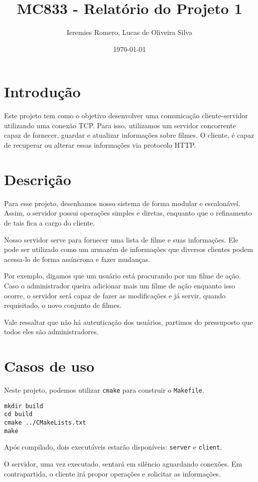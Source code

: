 \documentclass[11pt]{article}
\author{Ieremies Romero, Lucas de Oliveira Silva}
\date{\today}
\title{MC833 - Relatório do Projeto 1}
\theoremstyle{definition}
\theoremstyle{definition}
\theoremstyle{remark}
\theoremstyle{remark}
\theoremstyle{remark}
\theoremstyle{remark}
\theoremstyle{definition}
\begin{document}
\maketitle

\section*{Introdução}
\label{sec:org903b202}
Este projeto tem como o objetivo desenvolver uma comunicação cliente-servidor utilizando uma conexão TCP. Para isso, utilizamos um servidor concorrente capaz de fornecer, guardar e atualizar informações sobre filmes. O cliente, é capaz de recuperar ou alterar essas informações via protocolo HTTP.

\section*{Descrição}
\label{sec:orgba01a2d}
Para esse projeto, desenhamos nosso sistema de forma modular e escalonável. Assim, o servidor possui operações simples e diretas, enquanto que o refinamento de tais fica a cargo do cliente.

Nosso servidor serve para fornecer uma lista de filme e suas informações. Ele pode ser utilizado como um armazém de informações que diversos clientes podem acessa-lo de forma assíncrona e fazer mudanças.

Por exemplo, digamos que um usuário está procurando por um filme de ação. Caso o administrador queira adicionar mais um filme de ação enquanto isso ocorre, o servidor será capaz de fazer as modificações e já servir, quando requisitado, o novo conjunto de filmes.

Vale ressaltar que não há autenticação dos usuários, partimos do pressuposto que todos eles são administradores.
\section*{Casos de uso}
\label{sec:org4567054}
Neste projeto, podemos utilizar \texttt{cmake} para construir o \texttt{Makefile}.

\begin{verbatim}
mkdir build
cd build
cmake ../CMakeLists.txt
make
\end{verbatim}

Após compilado, dois executáveis estarão disponíveis: \texttt{server} e \texttt{client}.

O servidor, uma vez executado, sentará em silêncio aguardando conexões. Em contrapartida, o cliente irá propor operações e solicitar as informações.
\end{document}
